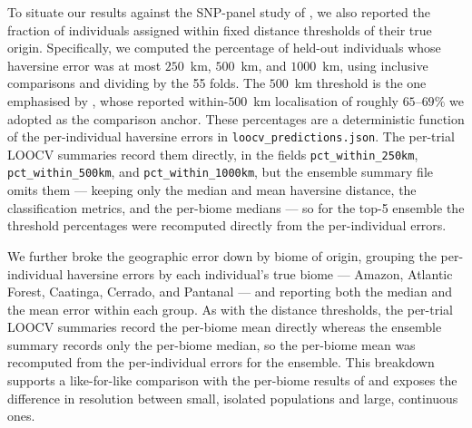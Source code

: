 \documentclass[twocolumn,10pt]{article}
\begin{document}
To situate our results against the SNP-panel study of \citet{lazzari2025development}, we also
reported the fraction of individuals assigned within fixed distance thresholds of their true origin.
Specifically, we computed the percentage of held-out individuals whose haversine error was at most
$250$~km, $500$~km, and $1000$~km, using inclusive comparisons and dividing by the 55 folds. The
$500$~km threshold is the one emphasised by \citet{lazzari2025development}, whose reported
within-$500$~km localisation of roughly $65$--$69\%$ we adopted as the comparison anchor. These
percentages are a deterministic function of the per-individual haversine errors in
\texttt{loocv\_predictions.json}. The per-trial LOOCV summaries record them directly, in the fields
\texttt{pct\_within\_250km}, \texttt{pct\_within\_500km}, and \texttt{pct\_within\_1000km}, but the
ensemble summary file omits them --- keeping only the median and mean haversine distance, the
classification metrics, and the per-biome medians --- so for the top-5 ensemble the threshold
percentages were recomputed directly from the per-individual errors.

We further broke the geographic error down by biome of origin, grouping the per-individual haversine
errors by each individual's true biome --- Amazon, Atlantic Forest, Caatinga, Cerrado, and Pantanal
--- and reporting both the median and the mean error within each group. As with the distance
thresholds, the per-trial LOOCV summaries record the per-biome mean directly whereas the ensemble
summary records only the per-biome median, so the per-biome mean was recomputed from the
per-individual errors for the ensemble. This breakdown supports a like-for-like comparison with the
per-biome results of \citet{lazzari2025development} and exposes the difference in resolution between
small, isolated populations and large, continuous ones.
\end{document}
